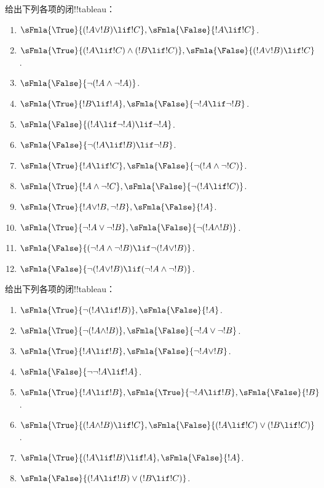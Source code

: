 \documentclass[../../../include/open-logic-section]{subfiles}
\begin{document}
\begin{prob}
给出下列各项的闭!!{tableau}：
\begin{enumerate}
\item $\sFmla{\True}{(!A \lor !B) \lif !C}, \sFmla{\False}{!A \lif !C}$.
\item $\sFmla{\True}{(!A \lif !C) \land (!B \lif !C)}, \sFmla{\False}{(!A \lor !B) \lif !C}$.
\item $\sFmla{\False}{\lnot(!A \land \lnot !A)}$.
\item $\sFmla{\True}{!B \lif !A}, \sFmla{\False}{\lnot !A \lif \lnot !B}$.
\item $\sFmla{\False}{(!A \lif \lnot !A) \lif \lnot !A}$.
\item $\sFmla{\False}{\lnot(!A \lif !B) \lif \lnot !B}$.
\item $\sFmla{\True}{!A \lif !C}, \sFmla{\False}{\lnot (!A \land \lnot !C)}$.
\item $\sFmla{\True}{!A \land \lnot !C}, \sFmla{\False}{\lnot (!A \lif !C)}$.
\item $\sFmla{\True}{!A \lor !B, \lnot !B}, \sFmla{\False}{!A}$.
\item $\sFmla{\True}{\lnot !A \lor \lnot !B}, \sFmla{\False}{\lnot(!A \land !B)}$.
\item $\sFmla{\False}{(\lnot !A \land \lnot !B) \lif\lnot(!A \lor !B)}$.
\item $\sFmla{\False}{\lnot(!A \lor !B) \lif (\lnot !A \land \lnot !B)}$.
\end{enumerate}
\end{prob}

\begin{prob}
给出下列各项的闭!!{tableau}：
\begin{enumerate}
\item $\sFmla{\True}{\lnot(!A \lif !B)}, \sFmla{\False}{!A}$.
\item $\sFmla{\True}{\lnot(!A \land !B)}, \sFmla{\False}{\lnot !A \lor \lnot !B}$.
\item $\sFmla{\True}{!A \lif !B}, \sFmla{\False}{\lnot !A \lor !B}$.
\item $\sFmla{\False}{\lnot \lnot !A \lif !A}$.
\item $\sFmla{\True}{!A \lif !B}, \sFmla{\True}{\lnot !A \lif !B}, \sFmla{\False}{!B}$.
\item $\sFmla{\True}{(!A \land !B) \lif !C}, \sFmla{\False}{(!A \lif !C) \lor (!B \lif !C)}$.
\item $\sFmla{\True}{(!A \lif !B) \lif !A}, \sFmla{\False}{!A}$.
\item $\sFmla{\False}{(!A \lif !B) \lor (!B \lif !C)}$.
\end{enumerate}
\end{prob}
\end{document}
